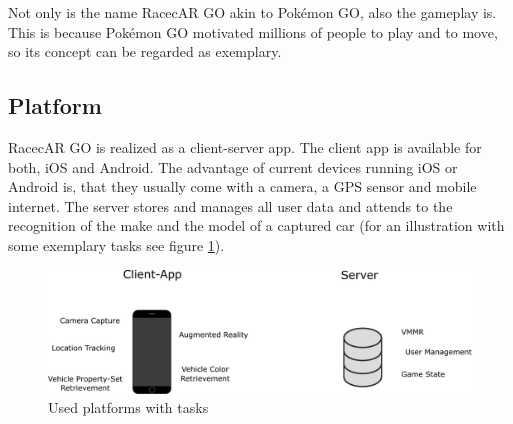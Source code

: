 Not only is the name RacecAR GO akin to Pok\'{e}mon GO, also the gameplay is. This is because Pok\'{e}mon GO motivated millions of people to play and to move, so its concept can be regarded as exemplary.

\subsection{Platform}
RacecAR GO is realized as a client-server app. The client app is available for both, iOS and Android. The advantage of current devices running iOS or Android is, that they usually come with a camera, a GPS sensor and mobile internet. The server stores and manages all user data and attends to the recognition of the make and the model of a captured car (for an illustration with some exemplary tasks see figure \ref{fig:platform}).

\begin{figure}[bth]
  \centering
        \includegraphics[width=.95\linewidth]{gfx/platform}
        \caption{Used platforms with tasks}
        \label{fig:platform}
\end{figure}

